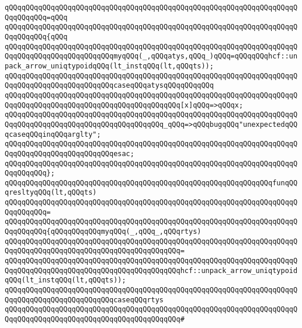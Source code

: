 \verb|qQQqqQQqqQQqqQQqqQQqqQQqqQQqqQQqqQQqqQQqqQQqqQQqqQQqqQQqqQQqqQQqqQQqqQQqqQQqqQQq=qQQq|\newline
\verb|qQQqqQQqqQQqqQQqqQQqqQQqqQQqqQQqqQQqqQQqqQQqqQQqqQQqqQQqqQQqqQQqqQQqqQQqqQQqqQQq{qQQq|\newline
\verb|qQQqqQQqqQQqqQQqqQQqqQQqqQQqqQQqqQQqqQQqqQQqqQQqqQQqqQQqqQQqqQQqqQQqqQQqqQQqqQQqqQQqqQQqqQQqqQQqmyqQQq(_,qQQqatys,qQQq_)qQQq=qQQqqQQqhcf::unpack_arrow_uniqtypoidqQQq(lt_instqQQq(lt,qQQqts));|\newline
\newline
\verb|qQQqqQQqqQQqqQQqqQQqqQQqqQQqqQQqqQQqqQQqqQQqqQQqqQQqqQQqqQQqqQQqqQQqqQQqqQQqqQQqqQQqqQQqqQQqqQQqcaseqQQqatysqQQqqQQqqQQq|\newline
\verb|qQQqqQQqqQQqqQQqqQQqqQQqqQQqqQQqqQQqqQQqqQQqqQQqqQQqqQQqqQQqqQQqqQQqqQQqqQQqqQQqqQQqqQQqqQQqqQQqqQQqqQQqqQQqqQQq[x]qQQq=>qQQqx;|\newline
\verb|qQQqqQQqqQQqqQQqqQQqqQQqqQQqqQQqqQQqqQQqqQQqqQQqqQQqqQQqqQQqqQQqqQQqqQQqqQQqqQQqqQQqqQQqqQQqqQQqqQQqqQQqqQQq_qQQq=>qQQqbugqQQq"unexpectedqQQqcaseqQQqinqQQqarglty";|\newline
\verb|qQQqqQQqqQQqqQQqqQQqqQQqqQQqqQQqqQQqqQQqqQQqqQQqqQQqqQQqqQQqqQQqqQQqqQQqqQQqqQQqqQQqqQQqqQQqqQQqesac;|\newline
\verb|qQQqqQQqqQQqqQQqqQQqqQQqqQQqqQQqqQQqqQQqqQQqqQQqqQQqqQQqqQQqqQQqqQQqqQQqqQQqqQQq};|\newline
\newline
\verb|qQQqqQQqqQQqqQQqqQQqqQQqqQQqqQQqqQQqqQQqqQQqqQQqqQQqqQQqqQQqqQQqfunqQQqresltyqQQq(lt,qQQqts)|\newline
\verb|qQQqqQQqqQQqqQQqqQQqqQQqqQQqqQQqqQQqqQQqqQQqqQQqqQQqqQQqqQQqqQQqqQQqqQQqqQQqqQQq=|\newline
\verb|qQQqqQQqqQQqqQQqqQQqqQQqqQQqqQQqqQQqqQQqqQQqqQQqqQQqqQQqqQQqqQQqqQQqqQQqqQQqqQQq{qQQqqQQqqQQqmyqQQq(_,qQQq_,qQQqrtys)|\newline
\verb|qQQqqQQqqQQqqQQqqQQqqQQqqQQqqQQqqQQqqQQqqQQqqQQqqQQqqQQqqQQqqQQqqQQqqQQqqQQqqQQqqQQqqQQqqQQqqQQqqQQqqQQqqQQqqQQq=|\newline
\verb|qQQqqQQqqQQqqQQqqQQqqQQqqQQqqQQqqQQqqQQqqQQqqQQqqQQqqQQqqQQqqQQqqQQqqQQqqQQqqQQqqQQqqQQqqQQqqQQqqQQqqQQqqQQqqQQqhcf::unpack_arrow_uniqtypoidqQQq(lt_instqQQq(lt,qQQqts));|\newline
\newline
\verb|qQQqqQQqqQQqqQQqqQQqqQQqqQQqqQQqqQQqqQQqqQQqqQQqqQQqqQQqqQQqqQQqqQQqqQQqqQQqqQQqqQQqqQQqqQQqqQQqcaseqQQqrtys|\newline
\verb|qQQqqQQqqQQqqQQqqQQqqQQqqQQqqQQqqQQqqQQqqQQqqQQqqQQqqQQqqQQqqQQqqQQqqQQqqQQqqQQqqQQqqQQqqQQqqQQqqQQqqQQqqQQqqQQq#|\newline
